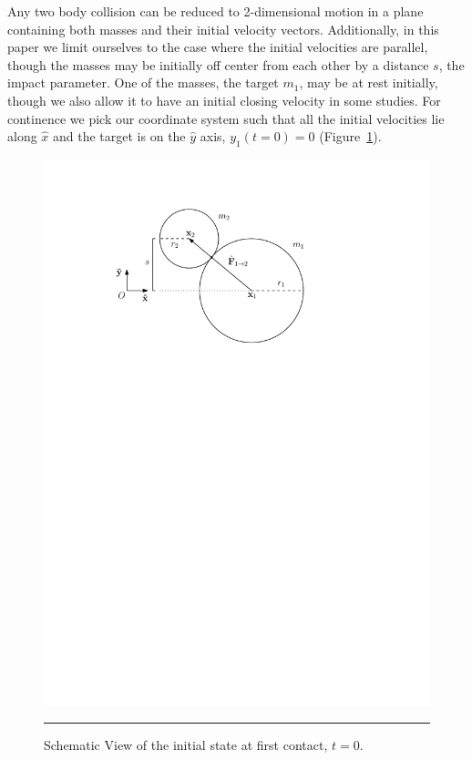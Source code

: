 \documentclass[aps,prl,floatfix,preprint,nofootinbib]{revtex4}
\begin{document}
Any two body collision can be reduced to 2-dimensional motion in a plane containing both masses and their initial velocity vectors. Additionally, in this paper we limit ourselves to the case where the initial velocities are parallel, though the masses may be initially off center from each other by a distance $s$, the impact parameter. One of the masses, the target $m_{1}$, may be at rest initially, though we also allow it to have an initial closing velocity in some studies. For continence we pick our coordinate system such that all the initial velocities lie along $\hat{x}$ and the target is on the $\hat{y}$ axis, $y_{1}(t=0)=0$ (Figure~\ref{fig:schematic}).

\begin{figure}[htbc]
	\centering
	\includegraphics[width=.75\textwidth]{plots/cj_diag.pdf}
	{\par\nobreak\rule[9pt]{35em}{0.5pt}\vspace{-5mm}}
	\caption{Schematic View of the initial state at first contact, $t = 0$.}
	\label{fig:schematic}
\end{figure}
\end{document}
